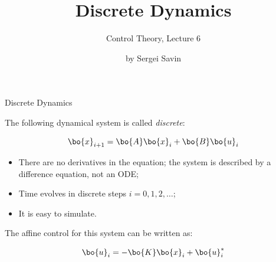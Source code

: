 \documentclass{beamer}
\title{Discrete Dynamics}
\subtitle{Control Theory, Lecture 6}
\author{by Sergei Savin}
\date{\mydate}
\begin{document}
\maketitle


%
%





\begin{frame}{Discrete Dynamics}
\begin{flushleft}

The following dynamical system is called \emph{discrete}:

\begin{equation}
    \bo{x}_{i+1} = \bo{A}\bo{x}_i + \bo{B}\bo{u}_i
\end{equation}


\begin{itemize}
    \item There are no derivatives in the equation; the system is described by a difference equation, not an ODE;
    \item Time evolves in discrete steps $i = 0,1,2,\dots$;
    \item It is easy to simulate.
\end{itemize}

\bigskip

The affine control for this system can be written as:

\begin{equation}
    \bo{u}_i = -\bo{K}\bo{x}_i + \bo{u}_i^*
\end{equation}

\end{flushleft}
\end{frame}
\end{document}
